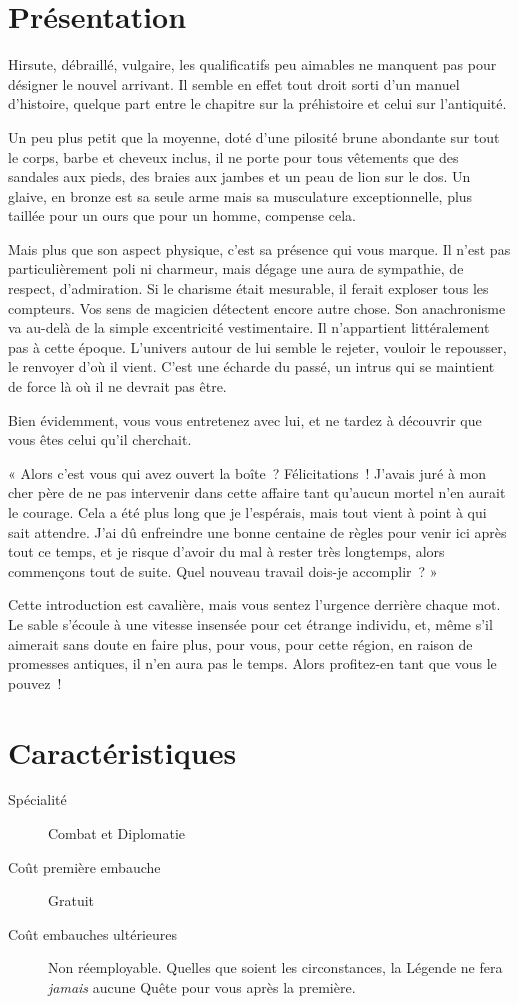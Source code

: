 \documentclass{report}
\newcommand{\herostats}[4]{
    \section{Présentation}

    #1

    \section{Caractéristiques}

    \begin{description}
        \item[Spécialité] #2
        \item[Coût première embauche] #3
        \item[Coût embauches ultérieures] #4
    \end{description}
}
\begin{document}
\herostats{
Hirsute, débraillé, vulgaire, les qualificatifs peu aimables ne manquent pas pour désigner le nouvel arrivant. Il semble en effet tout droit sorti d'un manuel d'histoire, quelque part entre le chapitre sur la préhistoire et celui sur l'antiquité.

Un peu plus petit que la moyenne, doté d'une pilosité brune abondante sur tout le corps, barbe et cheveux inclus, il ne porte pour tous vêtements que des sandales aux pieds, des braies aux jambes et un peau de lion sur le dos. Un glaive, en bronze est sa seule arme mais sa musculature exceptionnelle, plus taillée pour un ours que pour un homme, compense cela.

Mais plus que son aspect physique, c'est sa présence qui vous marque. Il n'est pas particulièrement poli ni charmeur, mais dégage une aura de sympathie, de respect, d'admiration. Si le charisme était mesurable, il ferait exploser tous les compteurs.
Vos sens de magicien détectent encore autre chose. Son anachronisme va au-delà de la simple excentricité vestimentaire. Il n'appartient littéralement pas à cette époque. L'univers autour de lui semble le rejeter, vouloir le repousser, le renvoyer d'où il vient. C'est une écharde du passé, un intrus qui se maintient de force là où il ne devrait pas être.

Bien évidemment, vous vous entretenez avec lui, et ne tardez à découvrir que vous êtes celui qu'il cherchait.

« Alors c'est vous qui avez ouvert la boîte ? Félicitations ! J'avais juré à mon cher père de ne pas intervenir dans cette affaire tant qu'aucun mortel n'en aurait le courage. Cela a été plus long que je l'espérais, mais tout vient à point à qui sait attendre. J'ai dû enfreindre une bonne centaine de règles pour venir ici après tout ce temps, et je risque d'avoir du mal à rester très longtemps, alors commençons tout de suite. Quel nouveau travail dois-je accomplir ? »

Cette introduction est cavalière, mais vous sentez l'urgence derrière chaque mot. Le sable s'écoule à une vitesse insensée pour cet étrange individu, et, même s'il aimerait sans doute en faire plus, pour vous, pour cette région, en raison de promesses antiques, il n'en aura pas le temps. Alors profitez-en tant que vous le pouvez !
}{
Combat et Diplomatie
}{
Gratuit
}{
Non réemployable. Quelles que soient les circonstances, la Légende ne fera \emph{jamais} aucune Quête pour vous après la première.
}

\end{document}
